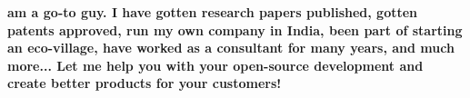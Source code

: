 \textbf{am a go-to guy. I have gotten research papers published, gotten patents approved, run my own company in India, been part of starting an eco-village, have worked as a consultant for many years, and much more... Let me help you with your open-source development and create better products for your customers!}

